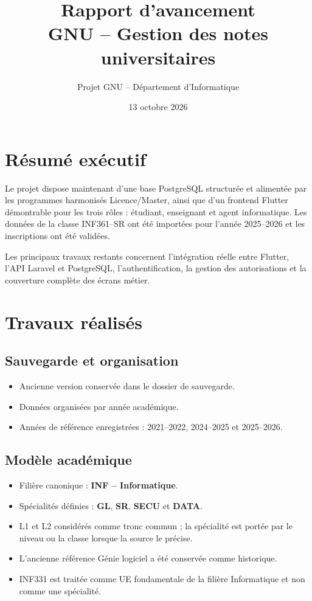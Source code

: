 \documentclass[11pt,a4paper]{article}
\title{Rapport d'avancement\\GNU -- Gestion des notes universitaires}
\author{Projet GNU -- Département d'Informatique}
\date{13 octobre 2026}
\begin{document}
\maketitle
\tableofcontents
\bigskip

\section{Résumé exécutif}
Le projet dispose maintenant d'une base PostgreSQL structurée et alimentée par les programmes harmonisés Licence/Master, ainsi que d'un frontend Flutter démontrable pour les trois rôles : étudiant, enseignant et agent informatique. Les données de la classe INF361--SR ont été importées pour l'année 2025--2026 et les inscriptions ont été validées.

Les principaux travaux restants concernent l'intégration réelle entre Flutter, l'API Laravel et PostgreSQL, l'authentification, la gestion des autorisations et la couverture complète des écrans métier.

\section{Travaux réalisés}
\subsection{Sauvegarde et organisation}
\begin{itemize}
  \item Ancienne version conservée dans le dossier de sauvegarde.
  \item Données organisées par année académique.
  \item Années de référence enregistrées : 2021--2022, 2024--2025 et 2025--2026.
\end{itemize}

\subsection{Modèle académique}
\begin{itemize}
  \item Filière canonique : \textbf{INF -- Informatique}.
  \item Spécialités définies : \textbf{GL}, \textbf{SR}, \textbf{SECU} et \textbf{DATA}.
  \item L1 et L2 considérés comme tronc commun ; la spécialité est portée par le niveau ou la classe lorsque la source le précise.
  \item L'ancienne référence Génie logiciel a été conservée comme historique.
  \item INF331 est traitée comme UE fondamentale de la filière Informatique et non comme une spécialité.
\end{itemize}
\end{document}
